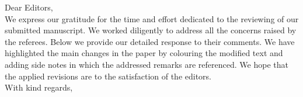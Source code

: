 \noindent
Dear Editors,
\\[2em]
We express our gratitude for the time and effort dedicated to the reviewing of our submitted manuscript. We worked diligently to address all the concerns raised by the referees. Below we provide our detailed response to their comments.
We have highlighted the main changes in the paper by colouring the modified text and adding side notes in which the addressed remarks are referenced.
We hope that the applied revisions are to the satisfaction of the editors.
\\[2em]
With kind regards,
\begin{flushright}
	\AuthorsInSignature
\end{flushright}
